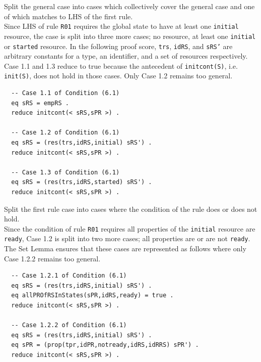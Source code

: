 \documentclass[12pt]{report}
\newcommand{\stt}[1]{{\small{\tt {#1}}}}
\begin{document}
 Split the general case into cases which
collectively cover the general case and one of which matches to LHS of
the first rule. \\ Since LHS of rule {\tt R01} requires the global
state to have at least one {\tt initial} resource, the case is split
into three more cases; no resource, at least one {\tt initial} or
{\tt started} resource. In the following proof score, {\tt trs},
{\tt idRS}, and {\tt sRS'} are arbitrary constants for a type, an
identifier, and a set of resources respectively.  Case 1.1 and 1.3
reduce to true because the antecedent of \stt{initcont(S)},
i.e. \stt{init(S)}, does not hold in those cases. Only Case 1.2
remains too general.
\begin{verbatim}
  -- Case 1.1 of Condition (6.1)
  eq sRS = empRS .
  reduce initcont(< sRS,sPR >) .

  -- Case 1.2 of Condition (6.1)
  eq sRS = (res(trs,idRS,initial) sRS') .
  reduce initcont(< sRS,sPR >) .

  -- Case 1.3 of Condition (6.1)
  eq sRS = (res(trs,idRS,started) sRS') .
  reduce initcont(< sRS,sPR >) .
\end{verbatim}

 Split the first rule case into cases where
the condition of the rule does or does not hold. \\ Since the
condition of rule {\tt R01} requires all properties of the
{\tt initial} resource are {\tt ready}, Case 1.2 is split into two
more cases; all properties are or are not {\tt ready}. The Set Lemma
ensures that these cases are represented as follows where only Case
1.2.2 remains too general.
\begin{verbatim}
  -- Case 1.2.1 of Condition (6.1)
  eq sRS = (res(trs,idRS,initial) sRS') .
  eq allPROfRSInStates(sPR,idRS,ready) = true .
  reduce initcont(< sRS,sPR >) .

  -- Case 1.2.2 of Condition (6.1)
  eq sRS = (res(trs,idRS,initial) sRS') .
  eq sPR = (prop(tpr,idPR,notready,idRS,idRRS) sPR') .
  reduce initcont(< sRS,sPR >) .
\end{verbatim}
\end{document}
